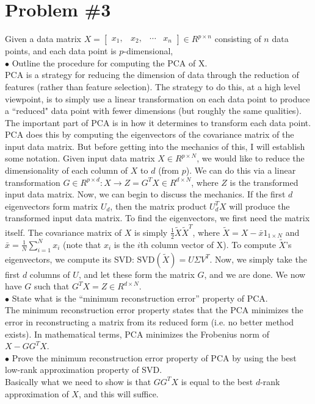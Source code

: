 \documentclass[12pt]{article}
\begin{document}
	\section*{Problem \#3}
	Given a data matrix $X = \left[
	\begin{array}{cccc}
	x_1, & x_2, & \cdots & x_n
	\end{array}
	\right] \in R^{p \times n}$ consisting of $n$ data points, and each data point is $p$-dimensional, \\
	$\bullet$ Outline the procedure for computing the PCA of X.\\
	PCA is a strategy for reducing the dimension of data through the reduction of features (rather than feature selection). The strategy to do this, at a high level viewpoint, is to simply use a linear transformation on each data point to produce a ``reduced" data point with fewer dimensions (but roughly the same qualities). The important part of PCA is in how it determines to transform each data point. PCA does this by computing the eigenvectors of the covariance matrix of the input data matrix. But before getting into the mechanics of this, I will establish some notation. Given input data matrix $X \in R^{p \times N}$, we would like to reduce the dimensionality of each column of $X$ to $d$ (from $p$). We can do this via a linear transformation $G \in R^{p \times d}: X \rightarrow Z = G^T X \in R^{d \times N}$, where $Z$ is the transformed input data matrix. Now, we can begin to discuss the mechanics. If the first $d$ eigenvectors form matrix $U_d$, then the matrix product $U_d^T X$ will produce the transformed input data matrix. To find the eigenvectors, we first need the matrix itself. The covariance matrix of $X$ is simply $\frac{1}{2}\tilde{X}\tilde{X}^T$, where $\tilde{X}=X-\bar{x}1_{1\times N}$ and $\bar{x} = \frac{1}{N}\sum_{i=1}^{N} x_i$ (note that $x_i$ is the $i$th column vector of X). To compute $\tilde{X}$'s eigenvectors, we compute its SVD: $\text{SVD}(\tilde{X}) = U\Sigma V^T$. Now, we simply take the first $d$ columns of $U$, and let these form the matrix $G$, and we are done. We now have $G$ such that $G^T X = Z \in R^{d \times N}$.
	\\
	$\bullet$ State what is the “minimum reconstruction error” property of PCA. \\
	The minimum reconstruction error property states that the PCA minimizes the error in reconstructing a matrix from its reduced form (i.e. no better method exists). In mathematical terms, PCA minimizes the Frobenius norm of $X - GG^T X$.
	\\
	$\bullet$ Prove the minimum reconstruction error property of PCA by using the best low-rank
	approximation property of SVD. \\
	Basically what we need to show is that $GG^T X$ is equal to the best $d$-rank approximation of $X$, and this will suffice.
	
\end{document}
